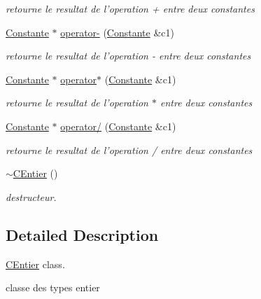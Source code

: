 \begin{DoxyCompactItemize}
\begin{DoxyCompactList}\small\item\em retourne le resultat de l'operation + entre deux constantes \end{DoxyCompactList}\item 
\hyperlink{class_constante}{Constante} $\ast$ \hyperlink{class_c_entier_a5f07b4783dfcfb024cf8c72caac64be7}{operator-\/} (\hyperlink{class_constante}{Constante} \&c1)
\begin{DoxyCompactList}\small\item\em retourne le resultat de l'operation -\/ entre deux constantes \end{DoxyCompactList}\item 
\hyperlink{class_constante}{Constante} $\ast$ \hyperlink{class_c_entier_a2ca548de9fa6c4446d4bd16c0061d3d9}{operator$\ast$} (\hyperlink{class_constante}{Constante} \&c1)
\begin{DoxyCompactList}\small\item\em retourne le resultat de l'operation $\ast$ entre deux constantes \end{DoxyCompactList}\item 
\hyperlink{class_constante}{Constante} $\ast$ \hyperlink{class_c_entier_a0cfb4e65d73cbe8e55be9ade1948d8ec}{operator/} (\hyperlink{class_constante}{Constante} \&c1)
\begin{DoxyCompactList}\small\item\em retourne le resultat de l'operation / entre deux constantes \end{DoxyCompactList}\item 
\hypertarget{class_c_entier_a8a0fdb1aaba3f57969497810665eed33}{\hyperlink{class_c_entier_a8a0fdb1aaba3f57969497810665eed33}{$\sim$\-C\-Entier} ()}\label{class_c_entier_a8a0fdb1aaba3f57969497810665eed33}

\begin{DoxyCompactList}\small\item\em destructeur. \end{DoxyCompactList}\end{DoxyCompactItemize}


\subsection{Detailed Description}
\hyperlink{class_c_entier}{C\-Entier} class. 

classe des types entier 

